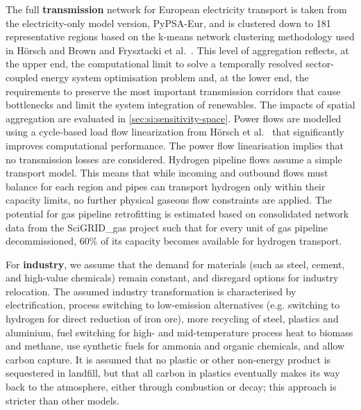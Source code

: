 The full \textbf{transmission} network for European electricity transport is
taken from the electricity-only model version,
PyPSA-Eur,\cite{horschPyPSAEurOpen2018} and is clustered down to 181
representative regions based on the k-means network clustering methodology used
in Hörsch and Brown\cite{Hoersch2017} and Frysztacki et
al.~\cite{frysztackiStrongEffect2021}. This level of aggregation reflects, at
the upper end, the computational limit to solve a temporally resolved
sector-coupled energy system optimisation problem and, at the lower end, the
requirements to preserve the most important transmission corridors that cause
bottlenecks and limit the system integration of renewables. The impacts of
spatial aggregation are evaluated in \cref{sec:si:sensitivity-space}.
Power flows are modelled using a cycle-based load flow linearization from Hörsch
et al.~\cite{horschLinearOptimal2018} that significantly improves computational
performance. The power flow linearisation implies that no transmission losses
are considered. Hydrogen pipeline flows assume a simple transport model. This
means that while incoming and outbound flows must balance for each region and
pipes can transport hydrogen only within their capacity limits, no further
physical gaseous flow constraints are applied. The potential for gas pipeline
retrofitting is estimated based on consolidated network data from the
SciGRID\_gas project \cite{plutaSciGRIDGas2022a} such that for every unit of gas
pipeline decommissioned, 60\% of its capacity becomes available for hydrogen
transport.\cite{gasforclimateEuropeanHydrogen2020}

For \textbf{industry}, we assume that the demand for materials (such as steel,
cement, and high-value chemicals) remain constant, and disregard options for
industry relocation.\cite{toktarovaInteractionElectrified2022} The assumed
industry transformation is characterised by electrification, process switching
to low-emission alternatives (e.g. switching to hydrogen for direct reduction of
iron ore\cite{voglAssessmentHydrogen2018}), more recycling of steel, plastics
and aluminium\cite{circular_economy}, fuel switching for high- and
mid-temperature process heat to biomass and methane, use synthetic fuels for
ammonia and organic chemicals, and allow carbon capture. It is assumed that no
plastic or other non-energy product is sequestered in landfill, but that all
carbon in plastics eventually makes its way back to the atmosphere, either
through combustion or decay; this approach is stricter than other models.
\cite{in-depth_2018}

